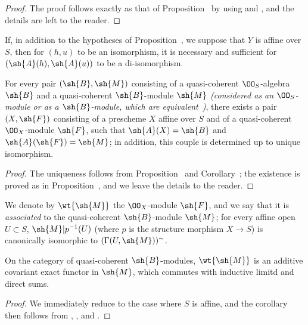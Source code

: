 \begin{proof}
\label{proof-2.1.4.1}
The proof follows exactly as that of Proposition~ by using  and , and the details are left to the reader.
\end{proof}

\begin{cor}[1.4.2]
\label{2.1.4.2}
If, in addition to the hypotheses of Proposition~, we suppose that $Y$ is affine over $S$, then for $(h,u)$ to be an isomorphism, it is necessary and sufficient for $(\sh{A}(h),\sh{A}(u))$ to be a di-isomorphism.
\end{cor}

\begin{prop}[1.4.3]
\label{2.1.4.3}
For every pair $(\sh{B},\sh{M})$ consisting of a quasi-coherent $\OO_S$-algebra $\sh{B}$ and a quasi-coherent $\sh{B}$-module $\sh{M}$ \emph{(considered as an $\OO_S$-module or as a $\sh{B}$-module, which are equivalent~)}, there exists a pair $(X,\sh{F})$ consisting of a prescheme $X$ affine over $S$ and of a quasi-coherent $\OO_X$-module $\sh{F}$, such that $\sh{A}(X)=\sh{B}$ and $\sh{A}(\sh{F})=\sh{M}$; in addition, this couple is determined up to unique isomorphism.
\end{prop}

\begin{proof}
\label{proof-2.1.4.3}
The uniqueness follows from Proposition~ and Corollary~; the existence is proved as in Proposition~, and we leave the details to the reader.
\end{proof}

We denote by $\wt{\sh{M}}$ the $\OO_X$-module $\sh{F}$, and we say that it is \emph{associated} to the quasi-coherent $\sh{B}$-module $\sh{M}$; for every affine open $U\subset S$, $\sh{M}|p^{-1}(U)$ (where $p$ is the structure morphism $X\to S$) is canonically isomorphic to $(\Gamma(U,\sh{M}))^\sim$.

\begin{cor}[1.4.4]
\label{2.1.4.4}
On the category of quasi-coherent $\sh{B}$-modules, $\wt{\sh{M}}$ is an additive covariant exact functor in $\sh{M}$, which commutes with inductive limitd and direct sums.
\end{cor}

\begin{proof}
\label{proof-2.1.4.4}
We immediately reduce to the case where $S$ is affine, and the corollary then follows from , , and .
\end{proof}

